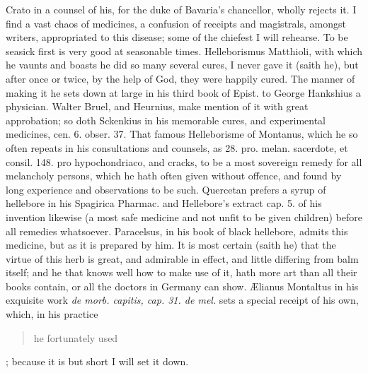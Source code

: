 Crato in a counsel of his, for the duke of Bavaria's chancellor, wholly
rejects it.
I find a vast chaos of medicines, a confusion of receipts and
magistrals, amongst writers, appropriated to this disease; some of the
chiefest I will rehearse. To be seasick first is very good at
seasonable times. Helleborismus Matthioli, with which he vaunts and
boasts he did so many several cures, I never gave it (saith he),
but after once or twice, by the help of God, they were happily cured.
The manner of making it he sets down at large in his third book of
Epist. to George Hankshius a physician. Walter Bruel, and Heurnius,
make mention of it with great approbation; so doth Sckenkius in his
memorable cures, and experimental medicines, cen. 6. obser. 37. That
famous Helleborisme of Montanus, which he so often repeats in his
consultations and counsels, as 28. pro. melan. sacerdote, et consil.
148. pro hypochondriaco, and cracks,  to be a most sovereign
remedy for all melancholy persons, which he hath often given without
offence, and found by long experience and observations to be such.
Quercetan prefers a syrup of hellebore in his Spagirica Pharmac. and
Hellebore's extract cap. 5. of his invention likewise (a most safe
medicine and not unfit to be given children) before all remedies
whatsoever. 
Paracelsus, in his book of black hellebore, admits this medicine, but
as it is prepared by him. It is most certain (saith he) that the
virtue of this herb is great, and admirable in effect, and little
differing from balm itself; and he that knows well how to make use of
it, hath more art than all their books contain, or all the doctors in
Germany can show.
\AE{}lianus Montaltus in his exquisite work \emph{de morb. capitis, cap. 31. de
mel.} sets a special receipt of his own, which, in his practice \blockquote{he
fortunately used}; because it is but short I will set it down.
\\

